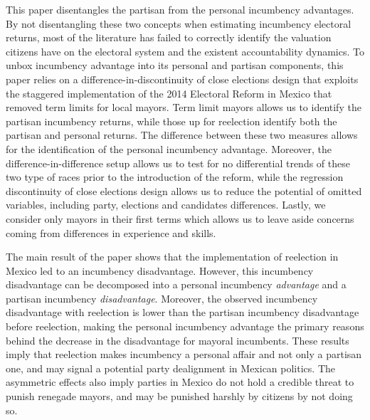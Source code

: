 \documentclass[12pt]{amsart}
\numberwithin{equation}{section}
\theoremstyle{definition}
\theoremstyle{definition}
\theoremstyle{definition}
\begin{document}
This paper disentangles the partisan from the personal incumbency advantages. By not disentangling these two concepts when estimating incumbency electoral returns, most of the literature has failed to correctly identify the valuation citizens have on the electoral system and the existent accountability dynamics. To unbox incumbency advantage into its personal and partisan components, this paper relies on a difference-in-discontinuity of close elections design that exploits the staggered implementation of the 2014 Electoral Reform in Mexico that removed term limits for local mayors. Term limit mayors allows us to identify the partisan incumbency returns, while those up for reelection identify both the partisan and personal returns. The difference between these two measures allows for the identification of the personal incumbency advantage. Moreover, the difference-in-difference setup allows us to test for no differential trends of these two type of races prior to the introduction of the reform, while the regression discontinuity of close elections design allows us to reduce the potential of omitted variables, including party, elections and candidates differences. Lastly, we consider only mayors in their first terms which allows us to leave aside concerns coming from differences in experience and skills. 

The main result of the paper shows that the implementation of reelection in Mexico led to an incumbency disadvantage. However, this incumbency disadvantage can be decomposed into a personal incumbency \emph{advantage} and a partisan incumbency  \emph{disadvantage}. Moreover, the observed incumbency disadvantage with reelection is lower than the partisan incumbency disadvantage before reelection, making the personal incumbency advantage the primary reasons behind the decrease in the disadvantage for mayoral incumbents. These results imply that reelection makes incumbency a personal affair and not only a partisan one, and may signal a potential party dealignment in Mexican politics. The asymmetric effects also imply parties in Mexico do not hold a credible threat to punish renegade mayors, and may be punished harshly by citizens by not doing so. 
\end{document}
